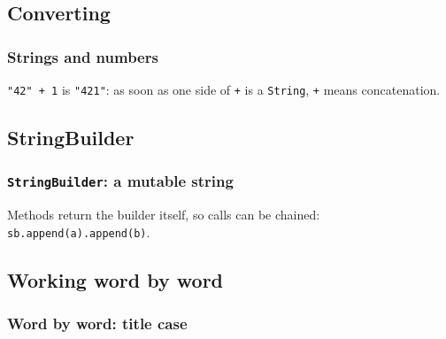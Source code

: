 \documentclass[aspectratio=169,10pt,compress]{beamer}
\begin{document}
\subsection[Convert]{Converting}




\begin{frame}[t,fragile] \frametitle{Strings and numbers}

  \vspace{0.3em}
  \small \texttt{"42" + 1} is \texttt{"421"}: as soon as one side of \texttt{+} is a \texttt{String}, \texttt{+} means concatenation.
\end{frame}


\subsection[Builder]{StringBuilder}




\begin{frame}[t,fragile] \frametitle{\texttt{StringBuilder}: a mutable string}

  \vspace{0.3em}
  \small Methods return the builder itself, so calls can be chained: \texttt{sb.append(a).append(b)}.
\end{frame}

\subsection[Words]{Working word by word}




\begin{frame}[t,fragile] \frametitle{Word by word: title case}
\end{frame}
\end{document}
